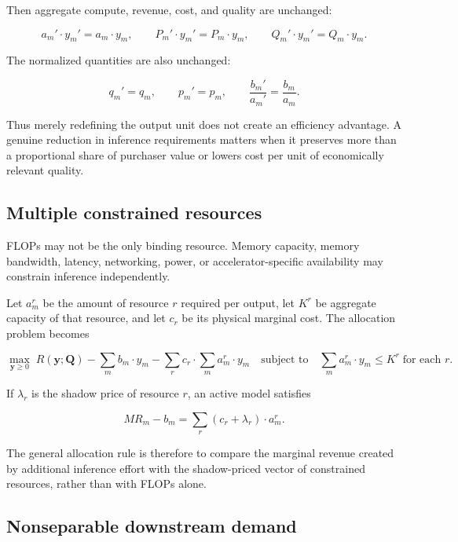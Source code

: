 \documentclass[11pt]{article}
\begin{document}
Then aggregate compute, revenue, cost, and quality are unchanged:

\begin{equation}a_m'\cdot y_m'=a_m\cdot y_m,\qquad P_m'\cdot y_m'=P_m\cdot y_m,\qquad Q_m'\cdot y_m'=Q_m\cdot y_m.\end{equation}

The normalized quantities are also unchanged:

\begin{equation}q_m'=q_m,\qquad p_m'=p_m,\qquad \frac{b_m'}{a_m'}=\frac{b_m}{a_m}.\end{equation}

Thus merely redefining the output unit does not create an efficiency advantage. A genuine reduction in inference requirements matters when it preserves more than a proportional share of purchaser value or lowers cost per unit of economically relevant quality.

\subsection{Multiple constrained resources}

FLOPs may not be the only binding resource. Memory capacity, memory bandwidth, latency, networking, power, or accelerator-specific availability may constrain inference independently.

Let $a_m^r$ be the amount of resource $r$ required per output, let $K^r$ be aggregate capacity of that resource, and let $c_r$ be its physical marginal cost. The allocation problem becomes

\begin{equation}\max_{\mathbf y\geq0}\;R(\mathbf y;\mathbf Q)-\sum_m b_m\cdot y_m-\sum_r c_r\cdot\sum_m a_m^r\cdot y_m\quad\text{subject to}\quad\sum_m a_m^r\cdot y_m\leq K^r\;\text{for each }r.\end{equation}

If $\lambda_r$ is the shadow price of resource $r$, an active model satisfies

\begin{equation}MR_m-b_m=\sum_r\left(c_r+\lambda_r\right)\cdot a_m^r.\end{equation}

The general allocation rule is therefore to compare the marginal revenue created by additional inference effort with the shadow-priced vector of constrained resources, rather than with FLOPs alone.

\subsection{Nonseparable downstream demand}
\end{document}
